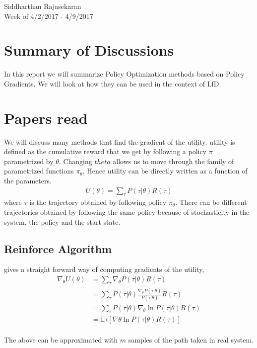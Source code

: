 \documentclass{article}[11pt]
\begin{document}
\begin{center}
Siddharthan Rajasekaran\\
Week of 4/2/2017 - 4/9/2017
\end{center}

\section{Summary of Discussions}
In this report we will summarize Policy Optimization methods based on Policy Gradients. We will look at how they can be used in the context of LfD.  

\section{Papers read}
We will discuss many methods that find the gradient of the utility. utility is defined as the cumulative reward that we get by following a policy $\pi$ parametrized by $\theta$. Changing $theta$ allows us to move through the family of parametrized functions $\pi_\theta$. Hence utility can be directly written as a function of the parameters. 
\begin{align*}
U(\theta) = \sum_\tau P(\tau|\theta)R(\tau)
\end{align*} where $\tau$ is the trajectory obtained by following policy $\pi_\theta$. There can be different trajectories obtained by following the same policy because of stochasticity in the system, the policy and the start state. 
\subsection{Reinforce Algorithm}

\cite{williams1992simple} gives a straight forward way of computing gradients of the utility, 
\begin{align*}
\nabla_\theta U(\theta) &= \sum_\tau \nabla_\theta P(\tau|\theta)R(\tau)\\
&=\sum_\tau P(\tau|\theta) \frac{\nabla_\theta P(\tau|\theta)}{P(\tau|\theta)}R(\tau)\\
&=\sum_\tau P(\tau|\theta) \nabla_\theta \ln P(\tau|\theta) R(\tau)\\
&=\mathbb{E}\tau [ \nabla\theta \ln P(\tau|\theta) R(\tau)]\\
\end{align*}

The above can be approximated with $m$ samples of the path taken in real system. 
\end{document}
